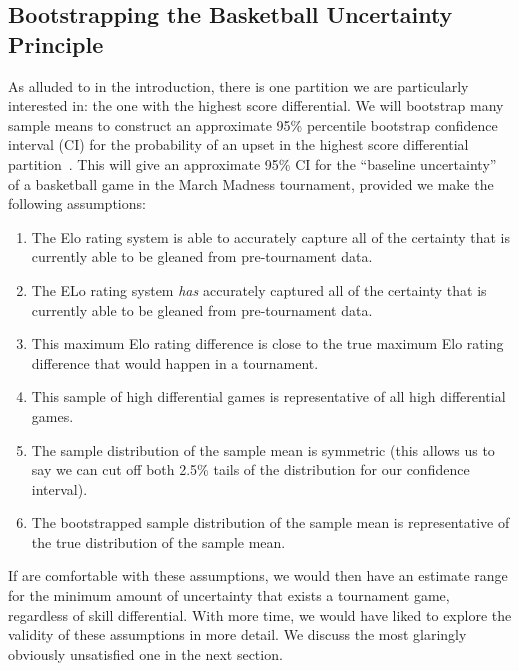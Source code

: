 \documentclass{article}
\begin{document}
\subsection{Bootstrapping the Basketball Uncertainty Principle}
As alluded to in the introduction, there is one partition we are particularly interested in: the one with the highest score differential. We will bootstrap many sample means to construct an approximate 95\% percentile bootstrap confidence interval (CI) for the probability of an upset in the highest score differential partition~\cite{uchicagoPercentileBootstrap}\cite{hesterberg_bootstrap_2015}. This will give an approximate 95\% CI for the ``baseline uncertainty'' of a basketball game in the March Madness tournament, provided we make the following assumptions:
\begin{enumerate}
    \item The Elo rating system is able to accurately capture all of the certainty that is currently able to be gleaned from pre-tournament data.
    \item The ELo rating system \textit{has} accurately captured all of the certainty that is currently able to be gleaned from pre-tournament data.
    \item This maximum Elo rating difference is close to the true maximum Elo rating difference that would happen in a tournament. 
    \item This sample of high differential games is representative of all high differential games.
    \item The sample distribution of the sample mean is symmetric (this allows us to say we can cut off both 2.5\% tails of the distribution for our confidence interval).
    \item The bootstrapped sample distribution of the sample mean is representative of the true distribution of the sample mean.
\end{enumerate}

If are comfortable with these assumptions, we would then have an estimate range for the minimum amount of uncertainty that exists a tournament game, regardless of skill differential. With more time, we would have liked to explore the validity of these assumptions in more detail. We discuss the most glaringly obviously unsatisfied one in the next section.


\end{document}
